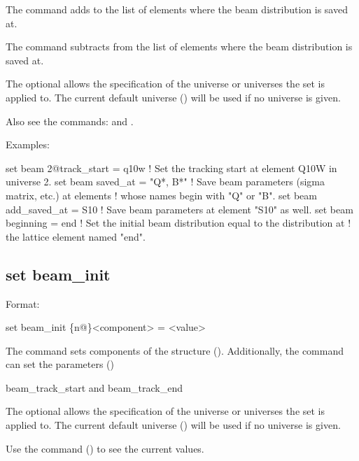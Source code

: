 {{The  command adds to the list of elements where the beam distribution is 
saved at. 

The  command subtracts from the list of elements where the beam distribution is 
saved at. 

The optional  allows the specification of the universe or universes the set is applied
to. The current default universe () will be used if no universe is given. 

Also see the commands:  and .

Examples:
\begin{example}
  set beam 2@track_start = q10w  ! Set the tracking start at element Q10W in universe 2.
  set beam saved_at = "Q*, B*"   ! Save beam parameters (sigma matrix, etc.) at elements
                                 !  whose names begin with "Q" or "B".
  set beam add_saved_at = S10    ! Save beam parameters at element "S10" as well.
  set beam beginning = end       ! Set the initial beam distribution equal to the distribution at
                                 !  the lattice element named "end".
\end{example}


\subsection{set beam_init}
\label{s:set.beam.init}

Format:
\begin{example}
  set beam_init \{n@\}<component> = <value>
\end{example}

The  command sets components of the  structure ().
Additionally, the  command can set the parameters ()
\begin{example}
  beam_track_start  and
  beam_track_end
\end{example}

The optional  allows the specification of the universe or universes the set is applied
to. The current default universe () will be used if no universe is given. 

Use the  command () to see the current values.

}}
